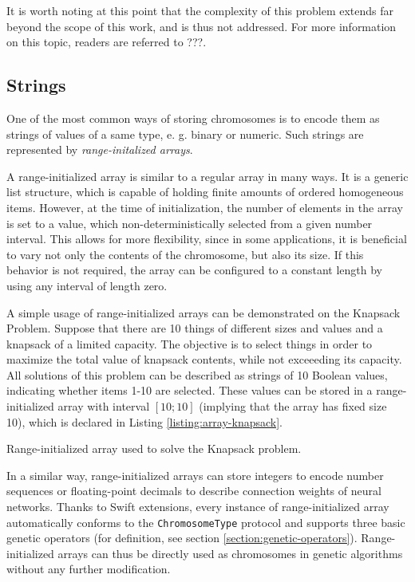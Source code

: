 It is worth noting at this point that the complexity of this problem extends far beyond the scope of this work, and is thus not addressed. For more information on this topic, readers are referred to ???. \todo

\subsection{Strings}\label{section:strings}
One of the most common ways of storing chromosomes is to encode them as strings of values of a same type, e. g. binary or numeric. Such strings are represented by \textit{range-initalized arrays}.

A range-initialized array is similar to a regular array in many ways. It is a generic list structure, which is capable of holding finite amounts of ordered homogeneous items. However, at the time of initialization, the number of elements in the array is set to a value, which non-deterministically selected from a given number interval. This allows for more flexibility, since in some applications, it is beneficial to vary not only the contents of the chromosome, but also its size. If this behavior is not required, the array can be configured to a constant length by using any interval of length zero.

A simple usage of range-initialized arrays can be demonstrated on the Knapsack Problem. Suppose that there are 10 things of different sizes and values and a knapsack of a limited capacity. The objective is to select things in order to maximize the total value of knapsack contents, while not exceeeding its capacity. All solutions of this problem can be described as strings of 10 Boolean values, indicating whether items 1-10 are selected. These values can be stored in a range-initialized array with interval $[10;10]$ (implying that the array has fixed size 10), which is declared in Listing \ref{listing:array-knapsack}.

\begin{listing}[ht]
	\caption{Range-initialized array used to solve the Knapsack problem.}
	\label{listing:array-knapsack}
\end{listing}

In a similar way, range-initialized arrays can store integers to encode number sequences or floating-point decimals to describe connection weights of neural networks. Thanks to Swift extensions, every instance of range-initialized array automatically conforms to the \texttt{ChromosomeType} protocol and supports three basic genetic operators (for definition, see section \ref{section:genetic-operators}). Range-initialized arrays can thus be directly used as chromosomes in genetic algorithms without any further modification.

